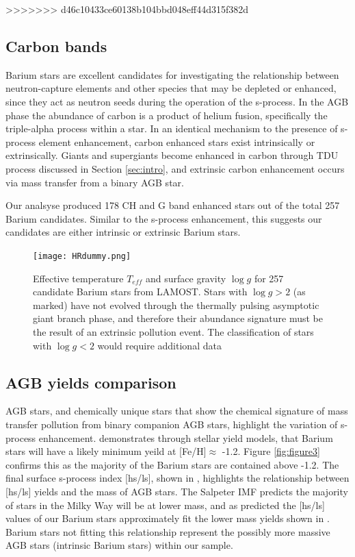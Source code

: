 \documentclass[a4paper,fleqn,usenatbib]{mnras}
\begin{document}
>>>>>>> d46c10433ce60138b104bbd048eff44d315f382d

\subsection{Carbon bands}
Barium stars are excellent candidates for investigating the relationship between neutron-capture elements and other species that may be depleted or enhanced, since they act as neutron seeds during the operation of the s-process. In the AGB phase the abundance of carbon is a product of helium fusion, specifically the triple-alpha process within a star. In an identical mechanism to the presence of s-process element enhancement, carbon enhanced stars exist intrinsically or extrinsically. Giants and supergiants become enhanced in carbon through TDU process discussed in Section \ref{sec:intro}, and extrinsic carbon enhancement occurs via mass transfer from a binary AGB star. 

Our analsyse produced 178 CH and G band enhanced stars out of the total 257 Barium candidates. Similar to the s-process enhancement, this suggests our candidates are either intrinsic or extrinsic Barium stars.

\begin{figure}
	\texttt{[image: HRdummy.png]}
    \caption{Effective temperature $T_{eff}$ and surface gravity $\log{g}$ for 257 candidate Barium stars from LAMOST. Stars with $\log{g} > 2$ (as marked) have not evolved through the thermally pulsing asymptotic giant branch phase, and therefore their abundance signature must be the result of an extrinsic pollution event. The classification of stars with $\log{g} < 2$ would require additional data}
    \label{fig:figure2}
\end{figure}


\subsection{AGB yields comparison}
AGB stars, and chemically unique stars that show the chemical signature
of mass transfer pollution from binary companion AGB stars, highlight the variation of s-process enhancement. \citet{karakas_lugaro2016} demonstrates through stellar yield models, that Barium stars will have a likely minimum yeild at [Fe/H]$\approx$ -1.2. Figure \ref{fig:figure3} confirms this as the majority of the Barium stars are contained above -1.2. The final surface s-process index [hs/ls], shown in \citet{cristallo2015}, highlights the relationship between [hs/ls] yields and the mass of AGB stars. The Salpeter IMF predicts the majority of stars in the Milky Way will be at lower mass, and as predicted the [hs/ls] values of our Barium stars approximately fit the lower mass yields shown in \citet{cristallo2015}. Barium stars not fitting this relationship represent the possibly more massive AGB stars (intrinsic Barium stars) within our sample. 
\end{document}
